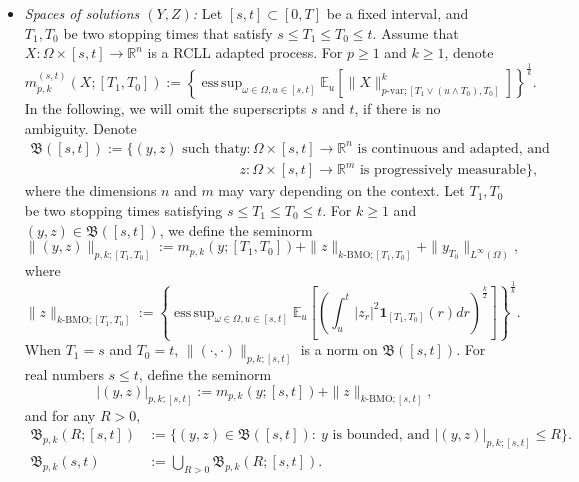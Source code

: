 \documentclass[11pt,reqno]{amsart}
\def\R{\mathbb R}
\DeclareMathOperator*{\esssup}{ess\,sup}
\numberwithin{equation}{section}
\begin{document}
\begin{itemize}
\item{\it Spaces of solutions $(Y,Z)$:}
Let $[s,t]\subset[0,T]$ be a fixed interval, and $T_{1},T_{0}$ be two stopping times that satisfy $s\le T_{1}\le T_{0}\le t$. Assume that $X:\Omega\times[s,t]\rightarrow \R^n$ is a RCLL adapted process. For $p\ge 1$ and $k\ge 1$, denote
\begin{equation}\label{e:def-norms}
m^{(s,t)}_{p,k}(X;[T_{1},T_{0}]):=\left\{\esssup_{\omega\in\Omega, u\in[s,t]}\mathbb{E}_{u}\left[\|X\|^{k}_{p\text{-var};[T_{1}\vee (u\land T_{0}),T_{0}]}\right]\right\}^{\frac{1}{k}}.
\end{equation}
In the following, we will omit the superscripts $s$ and $t$, if there is no ambiguity.
Denote 
\begin{equation*}
\begin{aligned}
\mathfrak{B}([s,t]):=\big\{(y,z) \text{ such that } &y:\Omega\times[s,t]\rightarrow\mathbb{R}^{n}\text{ is continuous and adapted, and }\\
&z:\Omega\times[s,t]\rightarrow\mathbb{R}^{m}\text{ is  progressively measurable}\big\},
\end{aligned}
\end{equation*}
where the dimensions $n$ and $m$ may vary depending on the context.
Let $T_{1},T_{0}$ be two stopping times satisfying $s\le T_{1}\le T_{0}\le t$. For  $k\ge1 $ and $(y,z)\in\mathfrak{B}([s,t])$, we define the seminorm 
\begin{equation}\label{def:norms'}
\|(y,z)\|_{p,k;[T_{1},T_{0}]} := m_{p, k}(y;[T_{1},T_{0}])+ \|z\|_{k\text{-BMO};[T_{1},T_{0}]} + \|y_{T_{0}}\|_{L^{\infty}(\Omega)},
\end{equation}
where
\begin{equation*}
\|z\|_{k\text{-BMO};[T_{1},T_{0}]} := \left\{\esssup_{\omega\in\Omega, u\in[s,t]}\mathbb{E}_{u}\left[\left(\int_{u}^{t}\left|z_{r}\right|^{2} \mathbf{1}_{[T_1,T_0]}(r)dr\right)^{\frac{k}{2}}\right]\right\}^{\frac{1}{k}}.
\end{equation*}
When $T_1=s$ and $T_0=t$, $\|(\cdot, \cdot)\|_{p,k;[s,t]}$ is a norm on $\mathfrak{B}([s,t])$. 
For real numbers $s\le t$, define the seminorm 
\[|(y,z)|_{p,k;[s,t]} := m_{p, k}(y;[s,t])+ \|z\|_{k\text{-BMO};[s,t]},\]
and for any $R>0,$
\begin{equation}
\begin{aligned}
\mathfrak B_{p, k}(R;[s,t])&:=\Big\{ (y,z) \in \mathfrak{B}([s,t]):\ y \text{ is bounded,}\text{ and } |(y,z)|_{p,k;[s,t]}\le R\Big\}.  \\ \label{e:def of B_p,k}
\mathfrak B_{p,k}(s, t)& :=\bigcup_{R>0} \mathfrak B_{p,k}(R;[s, t]).

\end{aligned}
\end{equation}
\end{itemize}
\end{document}
